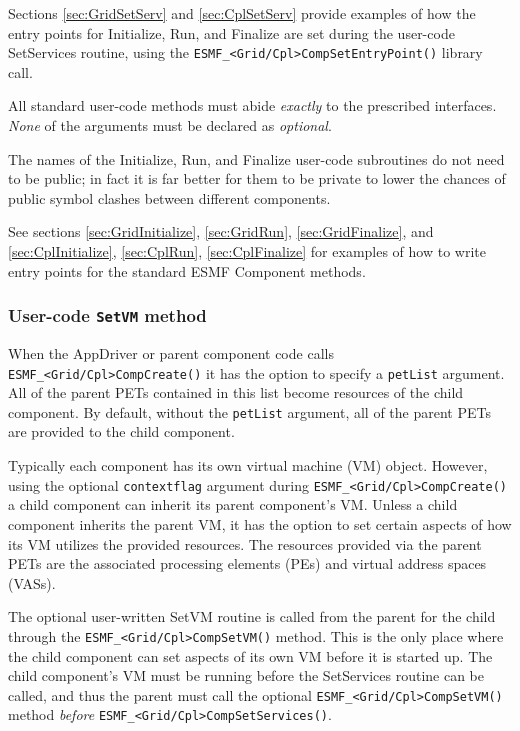 Sections \ref{sec:GridSetServ} and \ref{sec:CplSetServ} provide examples
of how the entry points for Initialize, Run, and Finalize are set during
the user-code SetServices routine, using the 
{\tt ESMF\_<Grid/Cpl>CompSetEntryPoint()} library call.

All standard user-code methods must abide {\em exactly} to the prescribed
interfaces. {\em None} of the arguments must be declared as {\em optional}.

The names of the Initialize, Run, and Finalize user-code subroutines do
not need to be public; in fact it is far better for them to be private to
lower the chances of public symbol clashes between different components.

See sections \ref{sec:GridInitialize}, \ref{sec:GridRun},
\ref{sec:GridFinalize}, and \ref{sec:CplInitialize}, \ref{sec:CplRun},
\ref{sec:CplFinalize} for examples of how to write entry points for the 
standard ESMF Component methods.


\subsubsection{User-code {\tt SetVM} method}
\label{sec:AppDriverSetVM}

When the AppDriver or parent component code calls
{\tt ESMF\_<Grid/Cpl>CompCreate()} it has the option to specify a 
{\tt petList} argument. All of the parent PETs contained in this list become
resources of the child component. By default, without the {\tt petList} argument, all of the parent PETs are provided to the child component.

Typically each component has its own virtual machine (VM) object. However, using the optional {\tt contextflag} argument during {\tt ESMF\_<Grid/Cpl>CompCreate()} a child component can inherit its parent component's VM. Unless a child component inherits the parent VM, it has the option to set certain aspects of how its VM utilizes the provided resources. The resources provided via the parent PETs are the associated processing elements (PEs) and virtual address spaces (VASs).

The optional user-written SetVM routine is called from the parent for the child through the {\tt ESMF\_<Grid/Cpl>CompSetVM()} method. This is the only place where the child component can set aspects of its own VM before it is started up. The child component's VM must be running before the SetServices routine can be called, and thus the parent must call the optional {\tt ESMF\_<Grid/Cpl>CompSetVM()} method {\em before} {\tt ESMF\_<Grid/Cpl>CompSetServices()}.

